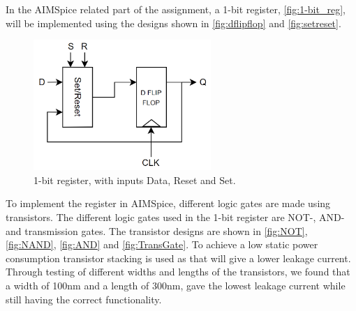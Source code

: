 In the AIMSpice related part of the assignment, a 1-bit register, \autoref{fig:1-bit_reg}, will be implemented using the designs shown in \autoref{fig:dflipflop} and \ref{fig:setreset}.

\begin{figure}[H]
    \centering
    \includegraphics[width=0.6\textwidth]{Figures/1-bit register.png}
    \caption{1-bit register, with inputs Data, Reset and Set.}
    \label{fig:1-bit_reg}
\end{figure}

To implement the register in AIMSpice, different logic gates are made using transistors. The different logic gates used in the 1-bit register are NOT-, AND- and transmission gates. The transistor designs are shown in \autoref{fig:NOT}, \ref{fig:NAND}, \ref{fig:AND} and \ref{fig:TransGate}. To achieve a low static power consumption transistor stacking is used as that will give a lower leakage current. Through testing of different widths and lengths of the transistors, we found that a width of 100nm and a length of 300nm, gave the lowest leakage current while still having the correct functionality. 

